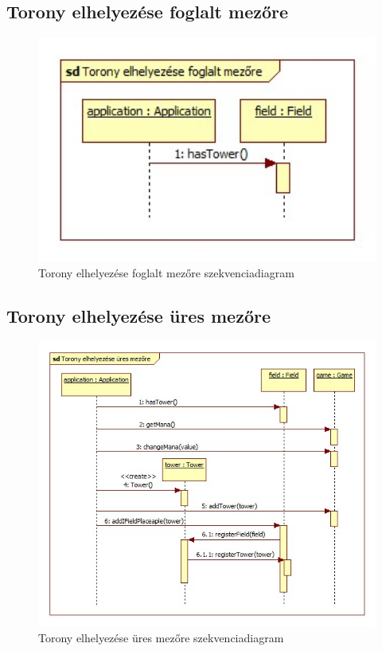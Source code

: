 \subsection{Torony elhelyezése foglalt mezőre}
\begin{figure}[H]
\begin{center}
\includegraphics[width=17cm]{chapters/chapter05/images/sd_Torony_elhelyezese_foglalt_mezore.jpg}
\caption{Torony elhelyezése foglalt mezőre szekvenciadiagram}
\label{fig:sd_Torony_elhelyezese_foglalt_mezore}
\end{center}
\end{figure}

\subsection{Torony elhelyezése üres mezőre}
\begin{figure}[H]
\begin{center}
\includegraphics[width=17cm]{chapters/chapter05/images/sd_Torony_elhelyezese_ures_mezore.jpg}
\caption{Torony elhelyezése üres mezőre szekvenciadiagram}
\label{fig:sd_Torony_elhelyezese_ures_mezore}
\end{center}
\end{figure}

